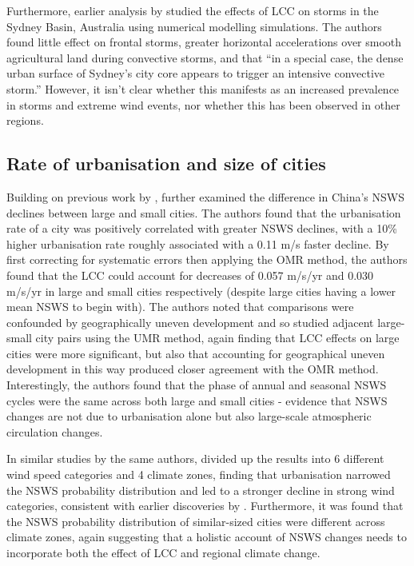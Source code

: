 Furthermore, earlier analysis by \citet{gero2006} studied the effects of \ac{LCC} on storms in the Sydney Basin, Australia using numerical modelling simulations. The authors found little effect on frontal storms, greater horizontal accelerations over smooth agricultural land during convective storms, and that “in a special case, the dense urban surface of Sydney’s city core appears to trigger an intensive convective storm.” However, it isn’t clear whether this manifests as an increased prevalence in storms and extreme wind events, nor whether this has been observed in other regions.

\subsection{Rate of urbanisation and size of cities}

Building on previous work by \citet{guo2011}, \citet{zha2017} further examined the difference in China’s \ac{NSWS} declines between large and small cities. The authors found that the urbanisation rate of a city was positively correlated with greater \ac{NSWS} declines, with a 10\% higher urbanisation rate roughly associated with a 0.11 m/s faster decline. By first correcting for systematic errors then applying the \ac{OMR} method, the authors found that the \ac{LCC} could account for decreases of 0.057 m/s/yr and 0.030 m/s/yr in large and small cities respectively (despite large cities having a lower mean \ac{NSWS} to begin with). The authors noted that comparisons were confounded by geographically uneven development and so studied adjacent large-small city pairs using the \ac{UMR} method, again finding that \ac{LCC} effects on large cities were more significant, but also that accounting for geographical uneven development in this way produced closer agreement with the \ac{OMR} method. Interestingly, the authors found that the phase of annual and seasonal \ac{NSWS} cycles were the same across both large and small cities - evidence that \ac{NSWS} changes are not due to urbanisation alone but also large-scale atmospheric circulation changes.

In similar studies by the same authors, \citet{zha2016, zha2017_zones} divided up the results into 6 different wind speed categories and 4 climate zones, finding that urbanisation narrowed the \ac{NSWS} probability distribution and led to a stronger decline in strong wind categories, consistent with earlier discoveries by \citet{guo2011}. Furthermore, it was found that the \ac{NSWS} probability distribution of similar-sized cities were different across climate zones, again suggesting that a holistic account of \ac{NSWS} changes needs to incorporate both the effect of \ac{LCC} and regional climate change.

